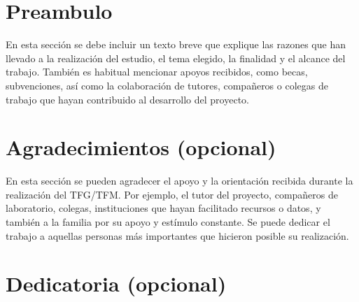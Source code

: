 

\chapter*{Preambulo}
\thispagestyle{empty}

En esta sección se debe incluir un texto breve que explique las razones que han llevado a la realización del estudio, el tema elegido, la finalidad y el alcance del trabajo. También es habitual mencionar apoyos recibidos, como becas, subvenciones, así como la colaboración de tutores, compañeros o colegas de trabajo que hayan contribuido al desarrollo del proyecto.

\cleardoublepage %


\chapter*{Agradecimientos (opcional)}
\thispagestyle{empty}
\vspace{1cm}

En esta sección se pueden agradecer el apoyo y la orientación recibida durante la realización del TFG/TFM. Por ejemplo, el tutor del proyecto, compañeros de laboratorio, colegas, instituciones que hayan facilitado recursos o datos, y también a la familia por su apoyo y estímulo constante. Se puede dedicar el trabajo a aquellas personas más importantes que hicieron posible su realización.

\cleardoublepage %


\chapter*{Dedicatoria (opcional)}
\thispagestyle{empty}


